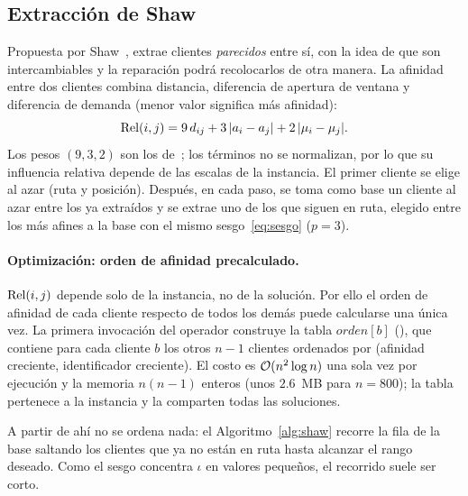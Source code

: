 \subsection{Extracción de Shaw}
\label{sec:shaw}

Propuesta por Shaw~\cite{shaw1998}, extrae clientes \emph{parecidos} entre sí, con la idea de
que son intercambiables y la reparación podrá recolocarlos de otra manera. La afinidad entre
dos clientes combina distancia, diferencia de apertura de ventana y diferencia de demanda
(menor valor significa más afinidad):
\begin{equation}
\operatorname{Rel}(i,j)=9\,d_{ij}+3\,|a_i-a_j|+2\,|\mu_i-\mu_j| .
\label{eq:rel}
\end{equation}
Los pesos $(9,3,2)$ son los de~\cite{ropke2006}; los términos no se normalizan, por lo que su
influencia relativa depende de las escalas de la instancia. El primer cliente se elige al azar
(ruta y posición). Después, en cada paso, se toma como base un cliente al azar entre los ya
extraídos y se extrae uno de los que siguen en ruta, elegido entre los más afines a la base
con el mismo sesgo~\eqref{eq:sesgo} ($p=3$).

\paragraph{Optimización: orden de afinidad precalculado.} $\operatorname{Rel}(i,j)$ depende solo de la
instancia, no de la solución. Por ello el orden de afinidad de cada cliente respecto de todos
los demás puede calcularse una única vez. La primera invocación del operador construye la
tabla $\textit{orden}[b]$ (), que contiene para cada cliente $b$
los otros $n-1$ clientes ordenados por (afinidad creciente, identificador creciente). El costo
es $\mathcal{O}(n^2\log n)$ una sola vez por ejecución y la memoria $n(n-1)$ enteros (unos $2.6$~MB
para $n=800$); la tabla pertenece a la instancia y la comparten todas las soluciones.

A partir de ahí no se ordena nada: el Algoritmo~\ref{alg:shaw} recorre la fila de la base
saltando los clientes que ya no están en ruta hasta alcanzar el rango deseado. Como el sesgo
concentra $\iota$ en valores pequeños, el recorrido suele ser corto.

